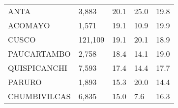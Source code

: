 \begin{tabular}{lllll}
	\cellcolor[HTML]{FF5050}ANTA                                   & 3,883                                                                 & 20.1                                                                             & 25.0                                                                        & 19.8                                                                                \\
	\cellcolor[HTML]{FF5050}ACOMAYO                                & 1,571                                                                 & 19.1                                                                             & 10.9                                                                        & 19.9                                                                                \\
	\cellcolor[HTML]{FF5050}CUSCO                                  & 121,109                                                               & 19.1                                                                             & 20.1                                                                        & 18.9                                                                                \\
	\cellcolor[HTML]{FF5050}PAUCARTAMBO                            & 2,758                                                                 & 18.4                                                                             & 14.1                                                                        & 19.0                                                                                \\
	\cellcolor[HTML]{FF5050}QUISPICANCHI                           & 7,593                                                                 & 17.4                                                                             & 14.4                                                                        & 17.7                                                                                \\
	\cellcolor[HTML]{FF5050}PARURO                                 & 1,893                                                                 & 15.3                                                                             & 20.0                                                                        & 14.4                                                                                \\
	\cellcolor[HTML]{FF5050}CHUMBIVILCAS                           & 6,835                                                                 & 15.0                                                                             & 7.6                                                                         & 16.3                                                                                \\

\end{tabular}
